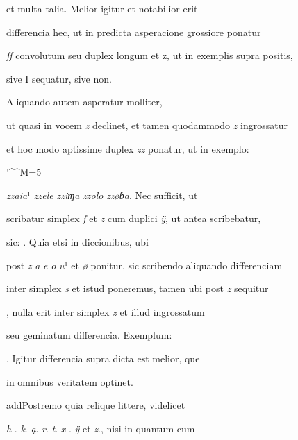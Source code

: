 et multa talia. Melior igitur et notabilior erit 

differencia hec, ut in predicta asperacione grossiore ponatur 

\textit{ſſ} convolutum seu duplex longum et z, ut in exemplis supra positis, 

\splitlines

sive I sequatur, sive non.

\indentK Aliquando autem asperatur molliter, 

\fulllines

ut quasi in vocem \textit{z} declinet, et tamen quodammodo \textit{z} ingrossatur 

et hoc modo aptissime duplex \textit{zz} ponatur, ut in exemplo: 

\catcode `\^^M=5
\obeylines

\textit{zzaia}¹ \textit{zzele} \textit{zziɱa} \textit{zzolo} \textit{zzøɓa}. Nec sufficit, ut 


scribatur simplex \textit{ſ} et \textit{z} cum duplici \textit{ÿ}, ut antea scribebatur, 

sic:  . Quia etsi in diccionibus, ubi 

post \textit{z} \textit{a} \textit{e} \textit{o} \textit{u}¹ et \textit{ø} ponitur, sic scribendo aliquando differenciam 

inter simplex \textit{s} et istud poneremus, tamen ubi post \textit{z} sequitur 

, nulla erit inter simplex \textit{z} et illud ingrossatum

seu geminatum differencia. Exemplum:   

. Igitur differencia 
supra dicta est melior, que 

in omnibus veritatem optinet. 

\indentP add{P}ostremo quia relique littere, videlicet 

\textit{h} . \textit{k}. \textit{ą}. \textit{r}. \textit{t}. \textit{x} . \textit{ÿ} et \textit{z}., nisi in quantum cum 


